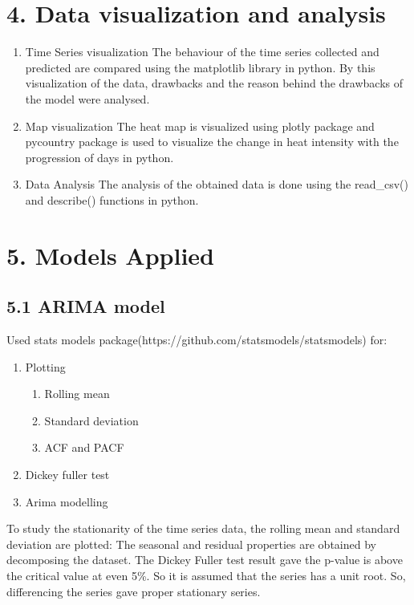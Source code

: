 \documentclass{cup-ino}
\begin{document}
\section{4. Data visualization and analysis}
\begin{enumerate}
    \item Time Series visualization
    The behaviour of the time series collected and predicted are compared using the matplotlib library in python. By this visualization of the data, drawbacks and the reason behind the drawbacks of the model were analysed.
    \item Map visualization
    The heat map is visualized using plotly package and pycountry package is used to visualize the change in heat intensity with the progression of days in python.
    \item Data Analysis
    The analysis of the obtained data is done using the read\_csv() and describe() functions in python.
\end{enumerate}

\section{5. Models Applied}
\subsection{5.1 ARIMA model}
Used stats models package(https://github.com/statsmodels/statsmodels) for:
\begin{enumerate}
    \item Plotting
        \begin{enumerate}
            \item Rolling mean
            \item Standard deviation
            \item ACF and PACF
        \end{enumerate}
    \item Dickey fuller test
    \item Arima modelling 
\end{enumerate}
To study the stationarity of the time series data, the rolling mean and standard deviation are plotted:
The seasonal and residual properties are obtained by decomposing the dataset.
The Dickey Fuller test result gave the p-value is above the critical value at even 5\%. So it is assumed that the series has a unit root. So, differencing the series gave proper stationary series.
\end{document}
